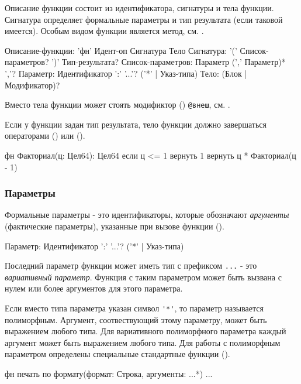 Описание функции состоит из идентификатора, сигнатуры  и тела функции. 
Сигнатура определяет формальные параметры и тип результата (если таковой имеется). 
Особым видом функции является метод, см. .

\begin{Grammar}
Описание-функции: 'фн' Идент-оп Сигнатура Тело
Сигнатура: '(' Список-параметров? ')' Тип-результата?
Список-параметров: Параметр (',' Параметр)* ','?
Параметр: Идентификатор ':' '...'? ('*' | Указ-типа)  
Тело: (Блок | Модификатор)?
\end{Grammar} 

Вместо тела функции может стоять модификтор () \verb|@внеш|, см. .

Если у функции задан тип результата, тело функции должно завершаться операторами  () или  ().

\begin{Trivil}
фн Факториал(ц: Цел64): Цел64 {
    если ц <= 1 { вернуть 1 }
    вернуть ц * Факториал(ц - 1)
}
\end{Trivil}

\hypertarget{params}{%
\subsubsection{Параметры}\label{decls:params}}

Формальные параметры - это идентификаторы, которые обозначают \emph{аргументы} (фактические параметры), указанные при вызове функции ().

\begin{Grammar}
Параметр: Идентификатор ':' '...'? ('*' | Указ-типа)  
\end{Grammar} 

Последний параметр функции может иметь тип с префиксом \verb|...| - это \emph{вариативный параметр}. Функция с таким параметром может быть вызвана с нулем или более аргументов для этого параметра.

Если вместо типа параметра указан символ \verb|'*'|, то параметр называется полиморфным.
Аргумент, соотвествующий этому параметру, может быть выражением любого типа. 
Для вариативного полиморфного параметра каждый аргумент может быть выражением любого типа. 
Для работы с полиморфным параметром определены специальные стандартные функции ().

\begin{Trivil}
фн печать по формату(формат: Строка, аргументы: ...*) {
...
}
\end{Trivil}

